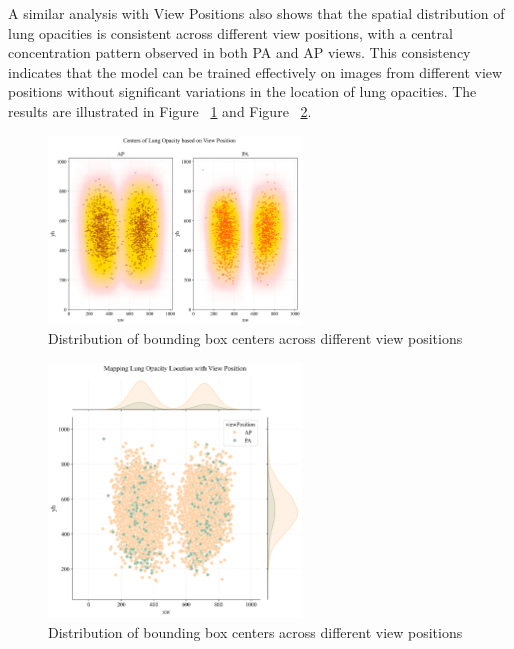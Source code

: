 A similar analysis with View Positions also shows that the spatial distribution of lung opacities is consistent across different view positions, with a central concentration pattern observed in both PA and AP views. This consistency indicates that the model can be trained effectively on images from different view positions without significant variations in the location of lung opacities. The results are illustrated in Figure ~\ref{fig:cha-2 figure13} and Figure ~\ref{fig:cha-2 figure14}.

\begin{figure}[H]
    \begin{center}
        \includegraphics[width = 0.6\textwidth]{figures/Figure18.png}
        \caption{Distribution of bounding box centers across different view positions}
        \label{fig:cha-2 figure13}
    \end{center}
\end{figure}

\begin{figure}[H]
    \begin{center}
        \includegraphics[width = 0.6\textwidth]{figures/Figure19.png}
        \caption{Distribution of bounding box centers across different view positions}
        \label{fig:cha-2 figure14}
    \end{center}
\end{figure}


